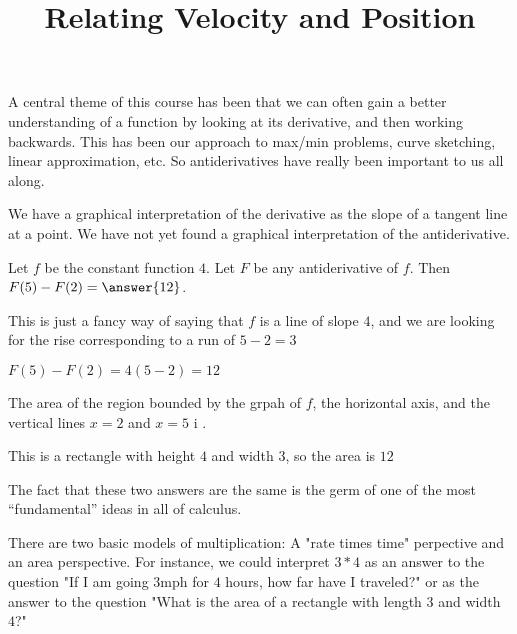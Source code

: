 \documentclass{ximera}
\title[Dig-In:]{Relating Velocity and Position}
\begin{document}
A central theme of this course has been that we can often gain a better understanding of a function by looking at its derivative, and then working backwards.  This has been our approach to max/min problems, curve sketching, linear approximation, etc.  So antiderivatives have really been important to us all along.

We have a graphical interpretation of the derivative as the slope of a tangent line at a point.  We have not yet found a graphical interpretation of the antiderivative.
\begin{question}
  \begin{question}
   Let $f$ be the constant function $4$. Let $F$ be any antiderivative of $f$.  Then $F(5)-F(2) = \answer{12}$.
   \begin{hint}
    This is just a fancy way of saying that $f$ is a line of slope $4$, and we are looking for the rise corresponding to a run of $5-2= 3$
   \end{hint}
   \begin{hint}
    $F(5) - F(2) = 4(5-2) = 12$
   \end{hint}
  \end{question}
  
  \begin{question}
    The area of the region bounded by the grpah of $f$, the horizontal axis, and the vertical lines $x=2$ and $x=5$ i .
    
    \begin{hint}
    \end{hint}
    \begin{hint}
      This is a rectangle with height $4$ and width $3$, so the area is $12$
    \end{hint}
  \end{question}
\end{question}

The fact that these two answers are the same is the germ of one of the most ``fundamental'' ideas in all of calculus.

\begin{idea}
  There are two basic models of multiplication:  A "rate times time" perpective and an area perspective.  For instance, we could interpret $3*4$ as an answer to the question "If I am going $3 \textrm{mph}$ for $4$ hours, how far have I traveled?" or as the answer to the question "What is the area of a rectangle with length $3$ and width $4$?"
\end{idea}
\end{document}
